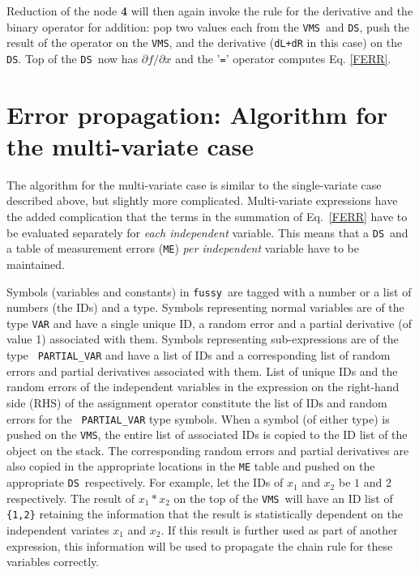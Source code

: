 \documentclass[11pt]{article}
\newcommand{\Fussy}{{\tt fussy}}
\newcommand{\DS}{{\tt DS}}
\newcommand{\VMS}{{\tt VMS}}
\begin{document}
Reduction of the node {\bf 4} will then again invoke the rule for the
derivative and the binary operator for addition: pop two values each
from the \VMS\ and \DS, push the result of the operator on the \VMS,
and the derivative ({\tt dL+dR} in this case) on the \DS.  Top of the
\DS\ now has $\partial f / \partial x$ and the '{\tt=}' operator
computes Eq. \ref{FERR}.

\section{Error propagation: Algorithm for the multi-variate case}
\label{SEC:MULTI_VAR}

The algorithm for the multi-variate case is similar to the
single-variate case described above, but slightly more complicated.
Multi-variate expressions have the added complication that the terms
in the summation of Eq.~\ref{FERR} have to be evaluated separately for
{\it each independent} variable.  This means that a \DS\ and a table
of measurement errors ({\tt ME}) {\it per independent} variable have
to be maintained.

Symbols (variables and constants) in \Fussy\ are tagged with a number
or a list of numbers (the IDs) and a type.  Symbols representing
normal variables are of the type {\tt VAR} and have a single unique
ID, a random error and a partial derivative (of value 1) associated
with them.  Symbols representing sub-expressions are of the type {\tt
PARTIAL\_VAR} and have a list of IDs and a corresponding list of
random errors and partial derivatives associated with them.  List of
unique IDs and the random errors of the independent variables in the
expression on the right-hand side (RHS) of the assignment operator
constitute the list of IDs and random errors for the {\tt
PARTIAL\_VAR} type symbols.  When a symbol (of either type) is pushed
on the \VMS, the entire list of associated IDs is copied to the ID
list of the object on the stack.  The corresponding random errors and
partial derivatives are also copied in the appropriate locations in
the {\tt ME} table and pushed on the appropriate \DS\ respectively.
For example, let the IDs of $x_1$ and $x_2$ be $1$ and $2$
respectively.  The result of $x_1 * x_2$ on the top of the \VMS\ will
have an ID list of {\tt \{1,2\}} retaining the information that the
result is statistically dependent on the independent variates $x_1$
and $x_2$.  If this result is further used as part of another
expression, this information will be used to propagate the chain rule
for these variables correctly.
\end{document}
